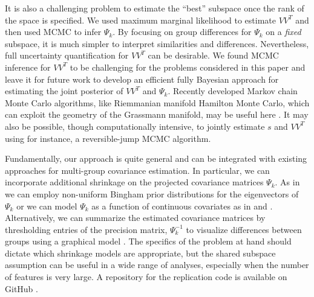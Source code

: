 \documentclass{statsoc}
\begin{document}
It is also a challenging problem to estimate the ``best'' subspace
once the rank of the space is specified.  We used maximum marginal
likelihood to estimate $VV^T$ and then used MCMC to
infer $\Psi_k$.  By focusing on group differences for $\Psi_k$ on a
\emph{fixed} subspace, it is much simpler to interpret similarities
and differences.  Nevertheless, full uncertainty quantification for
$VV^T$ can be desirable.  We found MCMC inference for $VV^T$ to be
challenging for the problems considered in this paper and leave it for
future work to develop an efficient fully Bayesian approach for
estimating the joint posterior of $VV^T$ and $\Psi_k$.  Recently
developed Markov chain Monte Carlo algorithms, like Riemmanian
manifold Hamilton Monte Carlo, which can exploit the geometry of the
Grassmann manifold, may be useful here \citep{Byrne2013,
  Girolami2011}.  It may also be possible, though computationally
intensive, to jointly estimate $s$ and $VV^T$ using for instance,
a reversible-jump MCMC algorithm.

Fundamentally, our approach is quite general and can be integrated
with existing approaches for multi-group covariance
estimation.  In particular, we can incorporate additional shrinkage on
the projected covariance matrices $\Psi_k$.  As in \citet{Hoff2009} we
can employ non-uniform Bingham prior distributions for the
eigenvectors of $\Psi_k$ or we can model $\Psi_k$ as a function of continuous
covariates as in \citet{Yin2010} and \citet{Hoff2011}.  Alternatively, we can
summarize the estimated covariance matrices by thresholding entries of
the precision matrix, $\Psi_k^{-1}$ to visualize differences between
groups using a graphical model \citep{Meinshausen2006}.  The specifics
of the problem at hand should dictate which shrinkage models are
appropriate, but the shared subspace assumption can be useful in a
wide range of analyses, especially when the number of features is very
large.  A repository for the replication code is available on GitHub \citep{FranksGit}.





\end{document}
